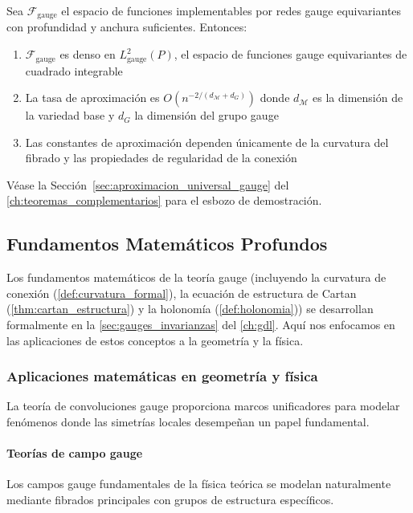 \begin{theorem}
Sea $\mathcal{F}_{\text{gauge}}$ el espacio de funciones implementables por redes gauge equivariantes con profundidad y anchura suficientes. Entonces:

\begin{enumerate}
\item $\mathcal{F}_{\text{gauge}}$ es denso en $L^2_{\text{gauge}}(P)$, el espacio de funciones gauge equivariantes de cuadrado integrable
\item La tasa de aproximación es $O(n^{-2/(d_{\mathcal{M}} + d_G)})$ donde $d_{\mathcal{M}}$ es la dimensión de la variedad base y $d_G$ la dimensión del grupo gauge
\item Las constantes de aproximación dependen únicamente de la curvatura del fibrado y las propiedades de regularidad de la conexión
\end{enumerate}

Véase la Sección~\ref{sec:aproximacion_universal_gauge} del \autoref{ch:teoremas_complementarios} para el esbozo de demostración.
\end{theorem}

\subsection{Fundamentos Matemáticos Profundos}

Los fundamentos matemáticos de la teoría gauge (incluyendo la curvatura de conexión (\autoref{def:curvatura_formal}), la ecuación de estructura de Cartan (\autoref{thm:cartan_estructura}) y la holonomía (\autoref{def:holonomia})) se desarrollan formalmente en la \autoref{sec:gauges_invarianzas} del \autoref{ch:gdl}. Aquí nos enfocamos en las aplicaciones de estos conceptos a la geometría y la física.

\subsubsection{Aplicaciones matemáticas en geometría y física}

La teoría de convoluciones gauge proporciona marcos unificadores para modelar fenómenos donde las simetrías locales desempeñan un papel fundamental.

\paragraph{Teorías de campo gauge}
Los campos gauge fundamentales de la física teórica se modelan naturalmente mediante fibrados principales con grupos de estructura específicos.

